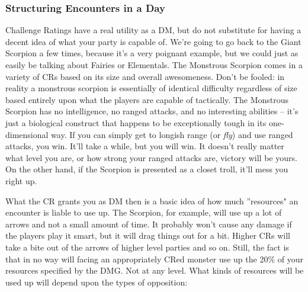 \subsubsection{Structuring Encounters in a Day}

Challenge Ratings have a real utility as a DM, but do not substitute for having a decent idea of what your party is capable of. We're going to go back to the Giant Scorpion a few times, because it's a very poignant example, but we could just as easily be talking about Fairies or Elementals. The Monstrous Scorpion comes in a variety of CRs based on its size and overall awesomeness. Don't be fooled: in reality a monstrous scorpion is essentially of identical difficulty regardless of size based entirely upon what the players are capable of tactically. The Monstrous Scorpion has no intelligence, no ranged attacks, and no interesting abilities -- it's just a biological construct that happens to be exceptionally tough in its one-dimensional way. If you can simply get to longish range (or \textit{fly}) and use ranged attacks, you win. It'll take a while, but you will win. It doesn't really matter what level you are, or how strong your ranged attacks are, victory will be yours. On the other hand, if the Scorpion is presented as a closet troll, it'll mess you right up.

What the CR grants you as DM then is a basic idea of how much ''resources" an encounter is liable to use up. The Scorpion, for example, will use up a lot of arrows and not a small amount of time. It probably won't cause any damage if the players play it smart, but it will drag things out for a bit. Higher CRs will take a bite out of the arrows of higher level parties and so on. Still, the fact is that in no way will facing an appropriately CRed monster use up the 20\% of your resources specified by the DMG. Not at any level. What kinds of resources will be used up will depend upon the types of opposition:

